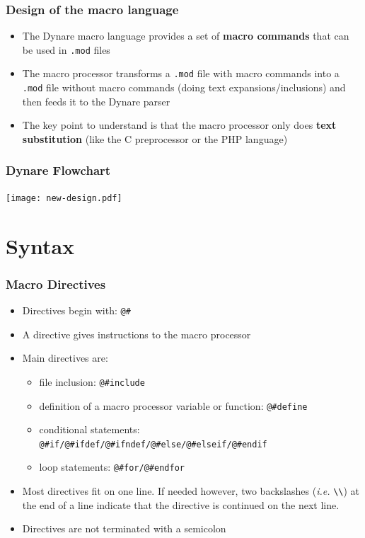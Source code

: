\documentclass[aspectratio=169]{beamer}
\begin{document}
\begin{frame}
  \frametitle{Design of the macro language}
  \begin{itemize}
  \item The Dynare macro language provides a set of \textbf{macro commands} that can be used in \texttt{.mod} files
  \item The macro processor transforms a \texttt{.mod} file with macro commands into a \texttt{.mod} file without macro commands (doing text expansions/inclusions) and then feeds it to the Dynare parser
  \item The key point to understand is that the macro processor only does \textbf{text substitution} (like the C preprocessor or the PHP language)
  \end{itemize}
\end{frame}

\begin{frame}
  \frametitle{Dynare Flowchart}
  \texttt{[image: new-design.pdf]}
\end{frame}

\section{Syntax}

\begin{frame}[fragile=singleslide]
  \frametitle{Macro Directives}
  \begin{itemize}
  \item Directives begin with: \verb+@#+
  \item A directive gives instructions to the macro processor
  \item Main directives are:
    \begin{itemize}
    \item file inclusion: \verb+@#include+
    \item definition of a macro processor variable or function: \verb+@#define+
    \item conditional statements: \verb+@#if/@#ifdef/@#ifndef/@#else/@#elseif/@#endif+
    \item loop statements: \verb+@#for/@#endfor+
    \end{itemize}
  \item Most directives fit on one line. If needed however, two backslashes (\textit{i.e.} \verb+\\+) at the end of a line indicate that the directive is continued on the next line.
  \item Directives are not terminated with a semicolon
  \end{itemize}
\end{frame}
\end{document}
